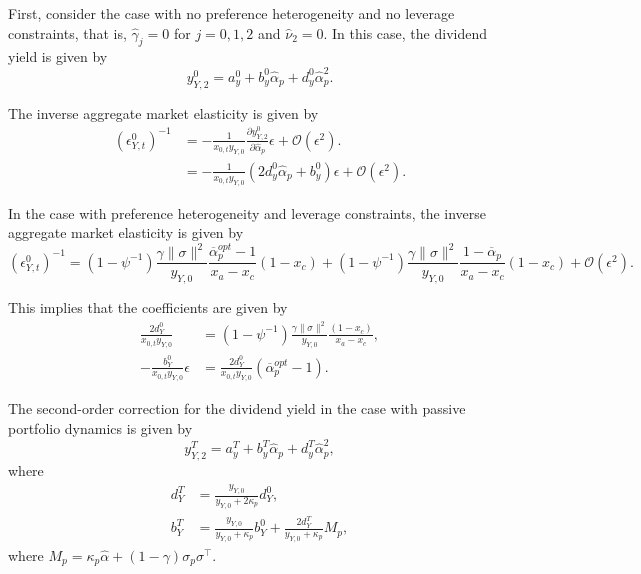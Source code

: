 First, consider the case with no preference heterogeneity and no leverage constraints, that is, $\hat{\gamma}_j=0$ for $j=0,1,2$ and $\hat{\nu}_2=0$.
In this case, the dividend yield is given by
\begin{equation}    
    y_{Y,2}^0 = a_y^0 + b_y^0 \hat{\alpha}_p + d_y^0 \hat{\alpha}_p^2.
\end{equation}

The inverse aggregate market elasticity is given by
\begin{align}
    (\epsilon_{Y,t}^0)^{-1} &= -\frac{1}{x_{0,t} y_{Y,0}} \frac{\partial y_{Y,2}^0}{\partial \hat{\alpha}_p} \epsilon + \mathcal{O}(\epsilon^2). \\
    &= -\frac{1}{x_{0,t} y_{Y,0}} \left(2 d_y^0 \hat{\alpha}_p + b_y^0 \right) \epsilon + \mathcal{O}(\epsilon^2).
\end{align}

In the case with preference heterogeneity and leverage constraints, the inverse aggregate market elasticity is given by
\begin{equation}
    (\epsilon_{Y,t}^0)^{-1} = (1-\psi^{-1}) \frac{\gamma\|\sigma\|^2}{y_{Y,0}} \frac{\overline{\alpha}_p^{opt}-1}{x_a-x_c} (1-x_c) +(1-\psi^{-1}) \frac{\gamma\|\sigma\|^2}{y_{Y,0}} \frac{1-\overline{\alpha}_p}{x_a-x_c} (1-x_c)  + \mathcal{O}(\epsilon^2).
\end{equation}

This implies that the coefficients are given by
\begin{align}   
    \frac{2 d_Y^0}{x_{0,t} y_{Y,0}} &= (1-\psi^{-1}) \frac{\gamma\|\sigma\|^2}{y_{Y,0}} \frac{(1-x_c)}{x_a-x_c} , \\
    -\frac{b_Y^0}{x_{0,t} y_{Y,0}} \epsilon &= \frac{2 d_Y^0}{x_{0,t} y_{Y,0}} (\overline{\alpha}_p^{opt}-1).
\end{align}

The second-order correction for the dividend yield in the case with passive portfolio dynamics is given by
\begin{equation}    
    y_{Y,2}^T = a_y^T + b_y^T \hat{\alpha}_p + d_y^T \hat{\alpha}_p^2,
\end{equation}
where
\begin{align}
    d_{Y}^T &= \frac{y_{Y,0}}{y_{Y,0}+2\kappa_p} d_Y^0,\\
    b_{Y}^T &= \frac{y_{Y,0}}{y_{Y,0}+\kappa_p} b_Y^0 + \frac{2 d_Y^T}{y_{Y,0}+\kappa_p} M_p,
\end{align}
where $M_p = \kappa_p \hat{\alpha} + (1-\gamma) \sigma_p \sigma^\top$.

